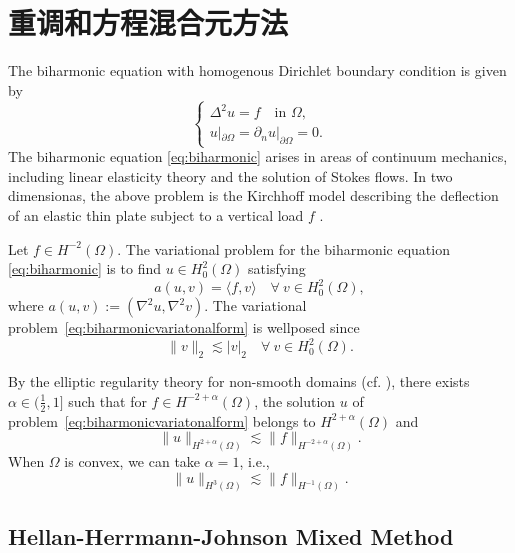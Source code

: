 \chapter{重调和方程混合元方法}

The biharmonic equation with homogenous Dirichlet
boundary condition is given by
\begin{equation}\label{eq:biharmonic}
\begin{cases}
\Delta^2u=f\quad \textrm{in }\Omega, \\
u|_{\partial\Omega}=\partial_{n}u|_{\partial\Omega}=0.
\end{cases}
\end{equation}
The biharmonic equation
\eqref{eq:biharmonic} arises in areas of continuum mechanics, including linear elasticity theory and the solution of Stokes flows.
In two dimensionas, the above problem is the Kirchhoff model describing the deflection of an elastic thin plate subject to a vertical
load $f$ \cite{FengShi1996,Reddy2006}.

Let $f\in H^{-2}(\Omega)$. The variational problem for the biharmonic equation
\eqref{eq:biharmonic} is to find $u\in H_0^2(\Omega)$ satisfying
\begin{equation}\label{eq:biharmonicvariatonalform}
a(u, v)=\langle f, v\rangle \quad\forall~v\in H_0^2(\Omega),
\end{equation}
where $a(u, v):=(\nabla^2u, \nabla^2v)$.
The variational problem~\eqref{eq:biharmonicvariatonalform} is wellposed since
\[
\|v\|_2\lesssim |v|_2\quad\forall~v\in H_0^2(\Omega).
\]

By the elliptic regularity theory for non-smooth domains (cf. \cite{BlumRannacher1980,Grisvard1985,Dauge1988,Grisvard1992}), there exists $\alpha\in (\frac{1}{2}, 1]$ such that for $f\in H^{-2+\alpha}(\Omega)$, the solution $u$ of problem~\eqref{eq:biharmonicvariatonalform}
belongs to $H^{2+\alpha}(\Omega)$ and
\[
\|u\|_{H^{2+\alpha}(\Omega)}\lesssim \|f\|_{H^{-2+\alpha}(\Omega)}.
\]
When $\Omega$ is convex, we can take $\alpha=1$, i.e.,
\[
\|u\|_{H^{3}(\Omega)}\lesssim \|f\|_{H^{-1}(\Omega)}.
\]





\section{Hellan-Herrmann-Johnson Mixed Method}

